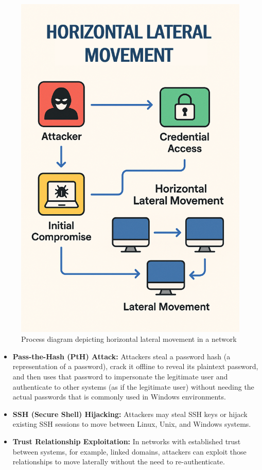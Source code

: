 \begin{figure}[H]
    \includegraphics[width=0.5\linewidth]{horizontal-movement.png}
    \caption{Process diagram depicting horizontal lateral movement in a network}
    \label{fig:placeholder}
\end{figure}
    \begin{itemize}
        \item \textbf{Pass-the-Hash (PtH) Attack:} Attackers steal a password hash (a representation of a password), crack it offline to reveal its plaintext password, and then uses that password to impersonate the legitimate user and authenticate to other systems (as if the legitimate user) without needing the actual passwords that is commonly used in Windows environments.
        \item \textbf{SSH (Secure Shell) Hijacking:} Attackers may steal SSH keys or hijack existing SSH sessions to move between Linux, Unix, and Windows systems.
        \item \textbf{Trust Relationship Exploitation:} In networks with established trust between systems, for example, linked domains, attackers can exploit those relationships to move laterally without the need to re-authenticate.
    \end{itemize}


